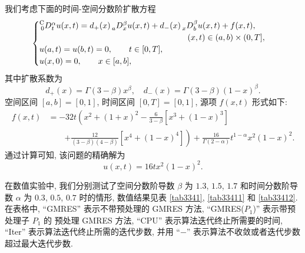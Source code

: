 \documentclass{ecnumaster}
\begin{document}
\bigskip
\begin{example}\label{example-1}
我们考虑下面的时间-空间分数阶扩散方程 %
\begin{equation}
\begin{cases}
\prescript{{\mathrm{C}}}{0}D_t^{\alpha} u(x, t) = d_+(x) \prescript{}{a}D_x^\beta u(x, t) + d_-(x) \prescript{}{x}D_b^\beta u(x, t) + f(x, t), \\
\qquad \qquad \qquad \qquad \qquad \qquad \qquad \qquad \qquad (x, t) \in (a, b) \times (0, T],\\
u(a, t) = u(b, t) = 0,  \qquad t \in [0, T],\\
u(x, 0) = 0, \qquad x \in [a, b],
 \end{cases}
\end{equation}
其中扩散系数为
\begin{equation}
  d_+(x) = \Gamma(3-\beta)x^{\beta}, \quad d_-(x) = \Gamma(3-\beta)(1-x)^{\beta}.
\end{equation}
空间区间 $[a, b] = [0, 1]$, 时间区间 $[0, T] = [0, 1]$,
源项 $f(x, t)$ 形式如下:
\begin{align*}
  f(x, t)
  & = -32t\left( x^2 + (1+x)^2 - \frac{6}{3-\beta}[x^3 + (1-x)^3] \right. \\
  &\quad\quad\left. + \frac{12}{(3-\beta)(4-\beta)}[x^4 +(1-x)^4] \right)
   + \frac{16}{\Gamma(2-\alpha)} t^{1-\alpha} x^2(1-x)^2.
\end{align*}
通过计算可知, 该问题的精确解为
\begin{equation}
  u(x, t) = 16tx^2(1-x)^2.
\end{equation}
\end{example}

在数值实验中, 我们分别测试了空间分数阶导数 $\beta$ 为 $1.3$, $1.5$, $1.7$
和时间分数阶导数 $\alpha$ 为 $0.3$, $0.5$, $0.7$ 时的情形,
数值结果见表 \ref{tab3341}, \ref{tab33411} 和 \ref{tab33412}.
在表格中, “GMRES” 表示不带预处理的 GMRES 方法,
“GMRES($P_1$)” 表示带预处理子 $P_1$ 的 预处理 GMRES 方法,
“CPU” 表示算法迭代终止所需要的时间,
“Iter” 表示算法迭代终止所需的迭代步数,
并用 “$-$” 表示算法不收敛或者迭代步数超过最大迭代步数.
\end{document}
